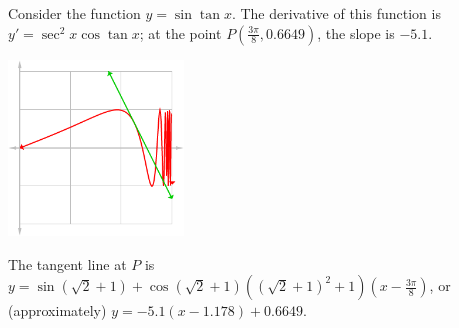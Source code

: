 \begin{ex}
  Consider the function $ y = \sin \tan x $. The derivative of this function is $ y' = \sec^2 x \cos \tan x $;
  at the point $ P(\frac{3\pi}{8}, 0.6649) $, the slope is $ -5.1 $.
  \begin{center}
    \includegraphics[width=0.35\textwidth]{tangentex}
  \end{center}

  The tangent line at $ P $ is $ y = \sin(\sqrt{2} + 1) + \cos(\sqrt{2} + 1)((\sqrt{2} + 1)^2 + 1)(x - \frac{3\pi}{8}) $, or
  (approximately) $ y = -5.1(x - 1.178) + 0.6649 $.
\end{ex}

\clearpage
